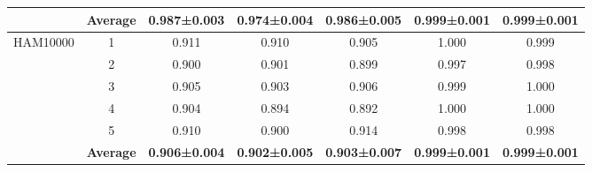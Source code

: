 \documentclass[review]{elsarticle}
\begin{document}
\begin{table*}[]
{\begin{tabular}{|c|c|c|c|c|c|c|}
                          & \textbf{Average} & \textbf{0.987±0.003} & \textbf{0.974±0.004} & \textbf{0.986±0.005} & \textbf{0.999±0.001} & \textbf{0.999±0.001} \\ \hline
\multirow{6}{*}{HAM10000} & 1                & 0.911                & 0.910                & 0.905                & 1.000                & 0.999                \\ \cline{2-7} 
                          & 2                & 0.900                & 0.901                & 0.899                & 0.997                & 0.998                \\ \cline{2-7} 
                          & 3                & 0.905                & 0.903                & 0.906                & 0.999                & 1.000                \\ \cline{2-7} 
                          & 4                & 0.904                & 0.894                & 0.892                & 1.000                & 1.000                \\ \cline{2-7} 
                          & 5                & 0.910                & 0.900                & 0.914                & 0.998                & 0.998                \\ \cline{2-7} 
                          & \textbf{Average} & \textbf{0.906±0.004} & \textbf{0.902±0.005} & \textbf{0.903±0.007} & \textbf{0.999±0.001} & \textbf{0.999±0.001} \\ \hline
\end{tabular}
}
\end{table*}
\end{document}
